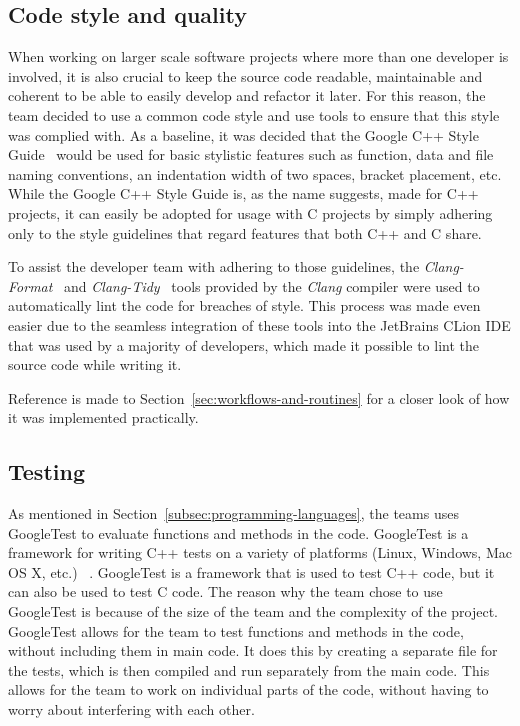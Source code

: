 \subsection{Code style and quality}\label{subsec:code-style-and-quality}

When working on larger scale software projects where more than one developer is involved, it is also crucial to keep the
source code readable, maintainable and coherent to be able to easily develop and refactor it later.
For this reason, the team decided to use a common code style and use tools to ensure that this style was complied with.
As a baseline, it was decided that the Google C++ Style Guide~\cite{google-style} would be used for basic stylistic
features such as function, data and file naming conventions, an indentation width of two spaces, bracket placement, etc.
While the Google C++ Style Guide is, as the name suggests, made for C++ projects, it can easily be adopted for usage
with C projects by simply adhering only to the style guidelines that regard features that both C++ and C share.

To assist the developer team with adhering to those guidelines, the \textit{Clang-Format}~\cite{clang-format} and
\textit{Clang-Tidy}~\cite{clang-tidy} tools provided by the \textit{Clang} compiler were used to automatically lint
the code for breaches of style.
This process was made even easier due to the seamless integration of these tools into the JetBrains CLion IDE that was
used by a majority of developers, which made it possible to lint the source code while writing it.


Reference is made to Section~\ref{sec:workflows-and-routines} for a closer look of how it was implemented practically.

\subsection{Testing}\label{subsec:testing}

As mentioned in Section~\ref{subsec:programming-languages}, the teams uses GoogleTest to evaluate functions and
methods in the code.
GoogleTest is a framework for writing C++ tests on a variety of platforms (Linux, Windows, Mac OS X, etc.)
~\cite{googletest}.
GoogleTest is a framework that is used to test C++ code, but it can also be used to test C code.
The reason why the team chose to use GoogleTest is because of the size of the team and the complexity of the project.
GoogleTest allows for the team to test functions and methods in the code, without including them in main code.
It does this by creating a separate file for the tests, which is then compiled and run separately from the main code.
This allows for the team to work on individual parts of the code, without having to worry about interfering with each
other.

